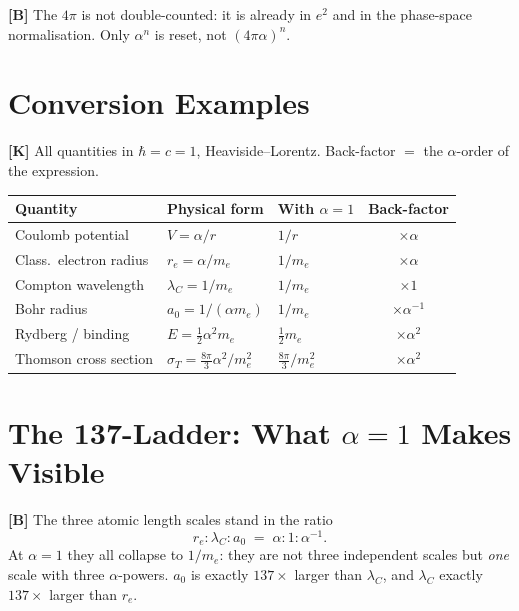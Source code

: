 \textbf{[B]} The $4\pi$ is not double-counted: it is already in $e^2$ and in the
phase-space normalisation. Only $\alpha^n$ is reset, not $(4\pi\alpha)^n$.

\section{Conversion Examples}

\textbf{[K]} All quantities in $\hbar=c=1$, Heaviside--Lorentz.
Back-factor $=$ the $\alpha$-order of the expression.

\begin{center}
\renewcommand{\arraystretch}{1.35}
{\small
\begin{tabular}{lllc}
\toprule
Quantity & Physical form & With $\alpha{=}1$ & Back-factor \\
\midrule
Coulomb potential      & $V = \alpha/r$                          & $1/r$            & $\times\alpha$      \\
Class.\ electron radius & $r_e = \alpha/m_e$                     & $1/m_e$          & $\times\alpha$      \\
Compton wavelength     & $\lambda_C = 1/m_e$                     & $1/m_e$          & $\times 1$          \\
Bohr radius            & $a_0 = 1/(\alpha m_e)$                  & $1/m_e$          & $\times\alpha^{-1}$ \\
Rydberg / binding      & $E = \tfrac12\alpha^2 m_e$              & $\tfrac12 m_e$   & $\times\alpha^2$    \\
Thomson cross section  & $\sigma_T = \tfrac{8\pi}{3}\alpha^2/m_e^2$ & $\tfrac{8\pi}{3}/m_e^2$ & $\times\alpha^2$ \\
\bottomrule
\end{tabular}
}
\renewcommand{\arraystretch}{1.0}
\end{center}

\section{The 137-Ladder: What $\alpha=1$ Makes Visible}

\textbf{[B]} The three atomic length scales stand in the ratio
\[
  r_e : \lambda_C : a_0 \;=\; \alpha : 1 : \alpha^{-1}.
\]
At $\alpha=1$ they all collapse to $1/m_e$: they are not three independent
scales but \emph{one} scale with three $\alpha$-powers. $a_0$ is exactly
$137\times$ larger than $\lambda_C$, and $\lambda_C$ exactly $137\times$ larger
than $r_e$.

